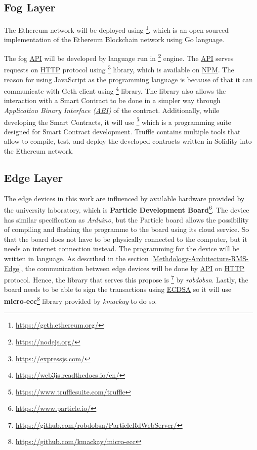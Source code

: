 \subsection{Fog Layer}
\npara The Ethereum network will be deployed using \footnote{\url{https://geth.ethereum.org/}}, which is an open-sourced implementation of the Ethereum Blockchain network using Go language.

\npara The fog \hyperref[Acronym-API]{API} will be developed by  language run in \footnote{\url{https://nodejs.org/}} engine.
The \hyperref[Acronym-API]{API} serves requests on \hyperref[Acronym-HTTP]{HTTP} protocol using \footnote{\url{https://expressjs.com/}} library, which is available on \hyperref[Acronym-NPM]{NPM}.
The reason for using JavaScript as the programming language is because of that it can communicate with Geth client using \footnote{\url{https://web3js.readthedocs.io/en/}} library.
The library also allows the interaction with a Smart Contract to be done in a simpler way through \textit{Application Binary Interface (\hyperref[Acronym-ABI]{ABI})} of the contract.
Additionally, while developing the Smart Contracts, it will use \footnote{\url{https://www.trufflesuite.com/truffle}} which is a programming suite designed for Smart Contract development.
Truffle contains multiple tools that allow to compile, test, and deploy the developed contracts written in Solidity into the Ethereum network.

\subsection{Edge Layer}
\npara The edge devices in this work are influenced by available hardware provided by the university laboratory, which is \textbf{Particle Development Board}\footnote{\url{https://www.particle.io/}}.
The device has similar specification as \textit{Arduino}, but the Particle board allows the possibility of compiling and flashing the programme to the board using its cloud service.
So that the board does not have to be physically connected to the computer, but it needs an internet connection instead.
The programming for the device will be written in  language.
As described in the section \ref{Methdology-Architecture-RMS-Edge}, the communication between edge devices will be done by \hyperref[Acronym-API]{API} on \hyperref[Acronym-HTTP]{HTTP} protocol.
Hence, the library that serves this propose is \footnote{\url{https://github.com/robdobsn/ParticleRdWebServer/}} by \textit{robdobsn}.
Lastly, the board needs to be able to sign the transactions using \hyperref[Acronym-ECDSA]{ECDSA} so it will use \textbf{micro-ecc}\footnote{\url{https://github.com/kmackay/micro-ecc}} library provided by \textit{kmackay} to do so.

